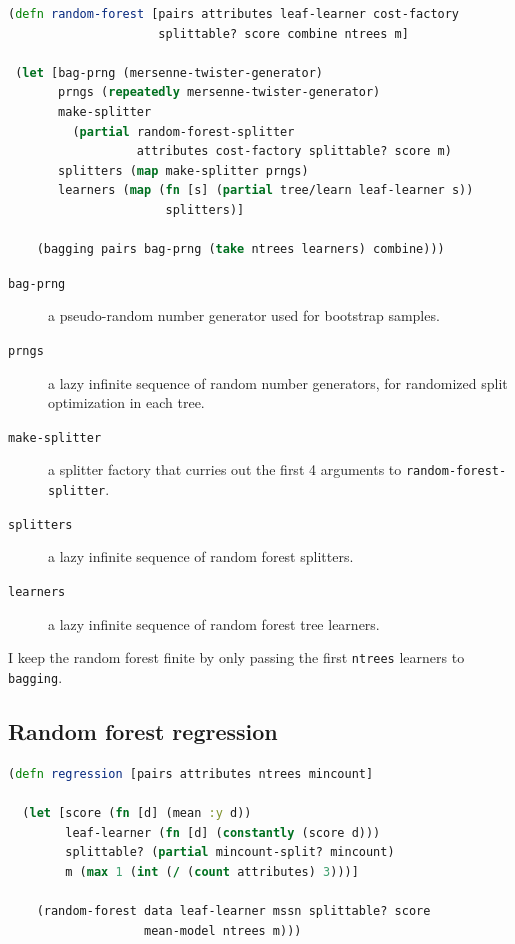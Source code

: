 \documentclass[11pt,openany,american,usenames,dvipsnames,svgnames,x11names,table,isodate]{article}
\numberwithin{equation}{section}
\numberwithin{figure}{section}
\begin{document}
\begin{minipage}[t]{1\columnwidth}%
\begin{lstlisting}[caption={Generic random forests},label={lis:random-forests},language=clojure,tabsize=2]
(defn random-forest [pairs attributes leaf-learner cost-factory
                     splittable? score combine ntrees m]

 (let [bag-prng (mersenne-twister-generator)
       prngs (repeatedly mersenne-twister-generator)
       make-splitter
         (partial random-forest-splitter 
                  attributes cost-factory splittable? score m)
       splitters (map make-splitter prngs)
       learners (map (fn [s] (partial tree/learn leaf-learner s)) 
                      splitters)]

    (bagging pairs bag-prng (take ntrees learners) combine)))  
\end{lstlisting}
%
\end{minipage}
\begin{description}
\item [{\texttt{bag-prng}}] a pseudo-random number generator used for bootstrap
samples.
\item [{\texttt{prngs}}] a lazy infinite sequence of random number generators,
for randomized split optimization in each tree.
\item [{\texttt{make-splitter}}] a splitter factory that curries out the
first 4 arguments to \texttt{random-forest-splitter}.
\item [{\texttt{splitters}}] a lazy infinite sequence of random forest
splitters.
\item [{\texttt{learners}}] a lazy infinite sequence of random forest tree
learners.
\end{description}
I keep the random forest finite by only passing the first \texttt{ntrees}
learners to \texttt{bagging}.

\subsection{\label{sub:Random-forest-regression}Random forest regression}

\begin{minipage}[t]{1\columnwidth}%
\begin{lstlisting}[caption={Random forest regression},label={lis:random-forest-regression},language=clojure,tabsize=2]
(defn regression [pairs attributes ntrees mincount]

  (let [score (fn [d] (mean :y d))
        leaf-learner (fn [d] (constantly (score d)))
        splittable? (partial mincount-split? mincount)
        m (max 1 (int (/ (count attributes) 3)))]

    (random-forest data leaf-learner mssn splittable? score
                   mean-model ntrees m)))
\end{lstlisting}
%
\end{minipage}
\end{document}
